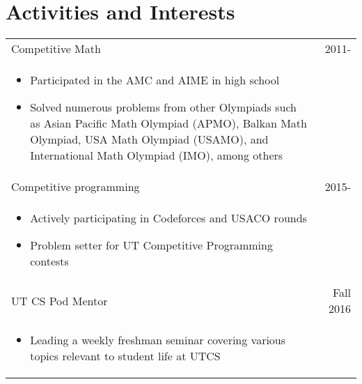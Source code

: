 \documentclass[9pt]{extarticle}
\begin{document}
\section*{Activities and Interests}
\begin{tabularx}{\textwidth}{X r }
    Competitive Math & 2011- \\
    \vspace{-2mm}
    \begin{itemize}[noitemsep,topsep=0pt]
        \item Participated in the AMC and AIME in high school
        \item Solved numerous problems from other Olympiads
                such as Asian Pacific Math Olympiad (APMO), Balkan Math Olympiad, USA Math Olympiad (USAMO),
                and International Math Olympiad (IMO), among others
    \end{itemize} & \\
    Competitive programming & 2015- \\
    \vspace{-2mm}
    \begin{itemize}[noitemsep,topsep=0pt]
        \item Actively participating in Codeforces and USACO rounds
        \item Problem setter for UT Competitive Programming contests
    \end{itemize} & \\
    UT CS Pod Mentor & Fall 2016 \\
    \vspace{-2mm}
    \begin{itemize}[noitemsep,topsep=0pt]
        \item Leading a weekly freshman seminar covering various topics relevant to student life at UTCS
    \end{itemize} & \\
\end{tabularx}
\end{document}
